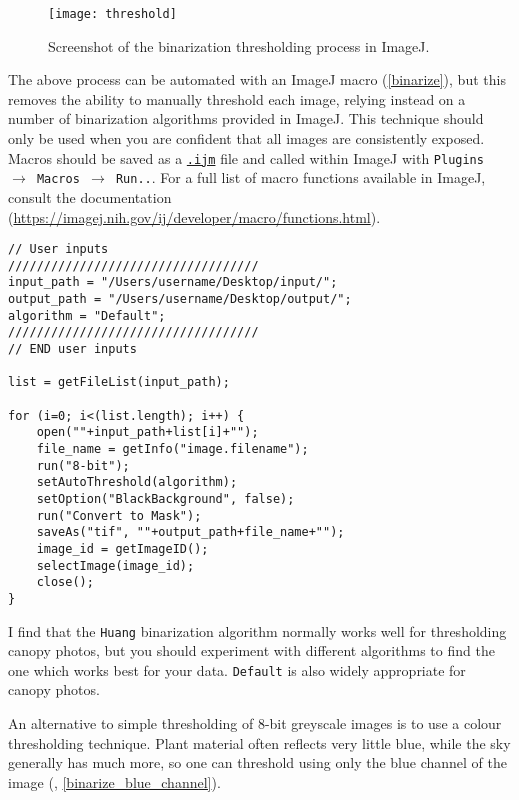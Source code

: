 \documentclass{article}
\newcommand\menu[1]{\texttt{\color{blue}#1}}
\newcommand\file[1]{\texttt{\underline{#1}}}
\begin{document}
\begin{figure}[H]
\centering
	\texttt{[image: threshold]}
	\caption{Screenshot of the binarization thresholding process in ImageJ.}
	\label{threshold}
\end{figure}

The above process can be automated with an ImageJ macro (\autoref{binarize}), but this removes the ability to manually threshold each image, relying instead on a number of binarization algorithms provided in ImageJ. This technique should only be used when you are confident that all images are consistently exposed. Macros should be saved as a \file{.ijm} file and called within ImageJ with \menu{Plugins $\rightarrow$ Macros $\rightarrow$ Run..}. For a full list of macro functions available in ImageJ, consult the documentation (\url{https://imagej.nih.gov/ij/developer/macro/functions.html}). 

\begin{minipage}{\linewidth}
\begin{lstlisting}[label=binarize,caption=ImageJ macro to binarize all images in a nominated directory. The macro can also be found in \file{binarize.ijm} in the supplementary material.]
// User inputs
///////////////////////////////////
input_path = "/Users/username/Desktop/input/";
output_path = "/Users/username/Desktop/output/";
algorithm = "Default";
///////////////////////////////////
// END user inputs

list = getFileList(input_path);

for (i=0; i<(list.length); i++) {
	open(""+input_path+list[i]+"");
	file_name = getInfo("image.filename");
	run("8-bit");
	setAutoThreshold(algorithm);
	setOption("BlackBackground", false);
	run("Convert to Mask");
	saveAs("tif", ""+output_path+file_name+"");
	image_id = getImageID();
	selectImage(image_id);
	close();
}
\end{lstlisting}
\end{minipage}

I find that the \verb|Huang| \citep{Huang1995} binarization algorithm normally works well for thresholding canopy photos, but you should experiment with different algorithms to find the one which works best for your data. \verb|Default| is also widely appropriate for canopy photos.

An alternative to simple thresholding of 8-bit greyscale images is to use a colour thresholding technique. Plant material often reflects very little blue, while the sky generally has much more, so one can threshold using only the blue channel of the image (\citealt{Brusa2014}, \autoref{binarize_blue_channel}).
\end{document}
